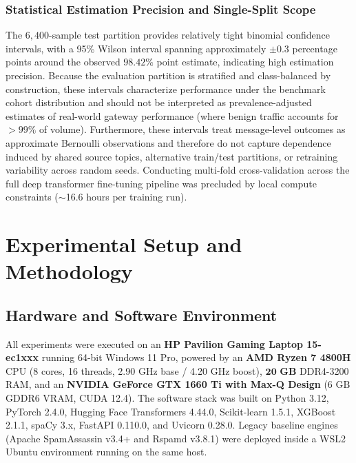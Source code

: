 \documentclass[journal]{IEEEtran}
\begin{document}
\subsubsection{Statistical Estimation Precision and Single-Split Scope}
The $6{,}400$-sample test partition provides relatively tight binomial confidence intervals, with a 95\% Wilson interval spanning approximately $\pm 0.3$ percentage points around the observed $98.42\%$ point estimate, indicating high estimation precision. Because the evaluation partition is stratified and class-balanced by construction, these intervals characterize performance under the benchmark cohort distribution and should not be interpreted as prevalence-adjusted estimates of real-world gateway performance (where benign traffic accounts for $>99\%$ of volume). Furthermore, these intervals treat message-level outcomes as approximate Bernoulli observations and therefore do not capture dependence induced by shared source topics, alternative train/test partitions, or retraining variability across random seeds. Conducting multi-fold cross-validation across the full deep transformer fine-tuning pipeline was precluded by local compute constraints ($\sim$16.6 hours per training run).


\section{Experimental Setup and Methodology}
\label{sec:experiments}

\subsection{Hardware and Software Environment}
All experiments were executed on an \textbf{HP Pavilion Gaming Laptop 15-ec1xxx} running 64-bit Windows 11 Pro, powered by an \textbf{AMD Ryzen 7 4800H} CPU (8 cores, 16 threads, 2.90 GHz base / 4.20 GHz boost), $\mathbf{20\text{ GB}}$ DDR4-3200 RAM, and an \textbf{NVIDIA GeForce GTX 1660 Ti with Max-Q Design} ($6\text{ GB}$ GDDR6 VRAM, CUDA 12.4). The software stack was built on Python 3.12, PyTorch 2.4.0, Hugging Face Transformers 4.44.0, Scikit-learn 1.5.1, XGBoost 2.1.1, spaCy 3.x, FastAPI 0.110.0, and Uvicorn 0.28.0. Legacy baseline engines (Apache SpamAssassin v3.4+ and Rspamd v3.8.1) were deployed inside a WSL2 Ubuntu environment running on the same host.
\end{document}
